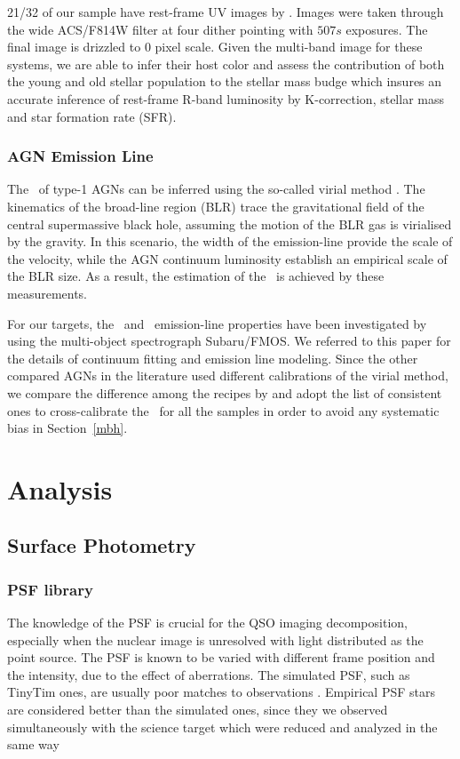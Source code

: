 \documentclass[apj]{emulateapj}
\begin{document}
21/32 of our sample have rest-frame UV images by \citet{Scoville2007}. %
Images were taken through the wide ACS/F814W filter at four dither pointing with $507s$ exposures. The final image is drizzled to 0 pixel scale. Given the multi-band image for these systems, we are able to infer their host color and assess the contribution of both the young and old stellar population to the stellar mass budge \citet{Gallazzi2009} which insures an accurate inference of rest-frame R-band luminosity by K-correction, stellar mass and star formation rate (SFR). 

\subsubsection{AGN Emission Line}
\label{sec:bh_mass}
The \mbh\ of type-1 AGNs can be inferred using the so-called virial method \citep{Peterson2004, Shen2013}. The kinematics of the broad-line region (BLR) trace the gravitational field of the central supermassive black hole, assuming the motion of the BLR gas is virialised by the gravity. In this scenario, the width of the emission-line provide the scale of the velocity, while the AGN continuum luminosity establish an empirical scale of the BLR size. As a result, the estimation of the \mbh\ is achieved by these measurements.

For our targets, the \halpha\ and \hbeta\ emission-line properties have been investigated by \citet{Schulze2018} using the multi-object spectrograph Subaru/FMOS. We referred to this paper for the details of continuum fitting and emission line modeling. Since the other compared AGNs in the literature used different calibrations of the virial method, we compare the difference among the recipes by \citet{Schulze2018, McG++08, Ding2017b} and adopt the list of consistent ones to cross-calibrate the \mbh\ for all the samples in order to avoid any systematic bias in Section~\ref{mbh}.
 
\section{Analysis}
\label{sec:analysis}

\subsection{Surface Photometry}
\subsubsection{PSF library}    
\label{sec:psf_library}
The knowledge of the PSF is crucial for the QSO imaging decomposition, especially when the nuclear image is unresolved with light distributed as the point source. The PSF is known to be varied with different frame position and the intensity, due to the effect of aberrations. The simulated PSF, such as {\sc TinyTim} ones, are usually poor matches to observations \citet{Mechtley2012}. Empirical PSF stars are considered better than the simulated ones, since they we observed simultaneously with the science target which were reduced and analyzed in the same way \citet{Kim2008, Park15}
\end{document}
